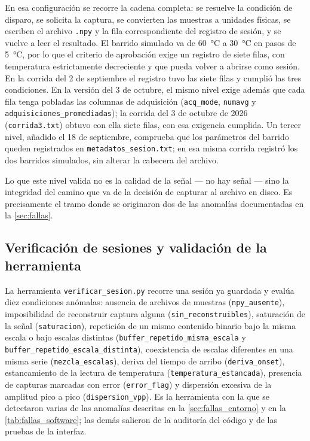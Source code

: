En esa configuración se recorre la cadena completa: se resuelve la
condición de disparo, se solicita la captura, se convierten las
muestras a unidades físicas, se escriben el archivo \texttt{.npy} y la
fila correspondiente del registro de sesión, y se vuelve a leer el
resultado. El barrido simulado va de \SI{60}{\celsius} a
\SI{30}{\celsius} en pasos de \SI{5}{\celsius}, por lo que el criterio
de aprobación exige un registro de siete filas, con temperatura
estrictamente decreciente y que pueda volver a abrirse como sesión. En
la corrida del 2 de septiembre el registro tuvo las siete filas y
cumplió las tres condiciones. En la versión del 3 de octubre, el mismo nivel
exige además que cada fila tenga pobladas las columnas de adquisición
(\texttt{acq\_mode}, \texttt{numavg} y
\texttt{adquisiciones\_\allowbreak{}promediadas}); la corrida del 3 de octubre
de 2026 (\texttt{corrida3.txt}) obtuvo con ella siete filas, con esa
exigencia cumplida. Un tercer nivel, añadido el 18 de septiembre,
comprueba que los parámetros del barrido queden registrados en
\texttt{metadatos\_\allowbreak{}sesion.txt}; en esa misma corrida registró los dos
barridos simulados, sin alterar la cabecera del archivo.

Lo que este nivel valida no es la calidad de la señal --- no hay señal
--- sino la integridad del camino que va de la decisión de capturar al
archivo en disco. Es precisamente el tramo donde se originaron dos de
las anomalías documentadas en la \cref{sec:fallas}.

\subsection{Verificación de sesiones y validación de la herramienta}
\label{sec:val_verificador}

La herramienta \texttt{verificar\_\allowbreak{}sesion.py} recorre una sesión ya
guardada y evalúa diez condiciones anómalas: ausencia de archivos de
muestras (\texttt{npy\_ausente}), imposibilidad de reconstruir captura
alguna (\texttt{sin\_\allowbreak{}reconstruibles}), saturación de la señal
(\texttt{saturacion}), repetición de un mismo contenido binario bajo
la misma escala o bajo escalas distintas
(\texttt{buffer\_\allowbreak{}repetido\_\allowbreak{}misma\_\allowbreak{}escala} y
\texttt{buffer\_\allowbreak{}repetido\_\allowbreak{}escala\_\allowbreak{}distinta}), coexistencia de escalas
diferentes en una misma serie (\texttt{mezcla\_escalas}), deriva del
tiempo de arribo (\texttt{deriva\_onset}), estancamiento de la lectura
de temperatura (\texttt{temperatura\_\allowbreak{}estancada}), presencia de
capturas marcadas con error (\texttt{error\_flag}) y dispersión
excesiva de la amplitud pico a pico (\texttt{dispersion\_vpp}). Es la
herramienta con la que se detectaron varias de las anomalías descritas
en la \cref{sec:fallas_entorno} y en la \cref{tab:fallas_software}; las
demás salieron de la auditoría del código y de las pruebas de la
interfaz.

